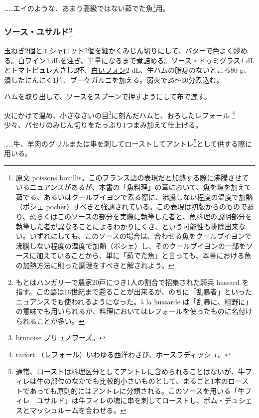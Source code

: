 \begin{recette}
\ldots{}\ldots{}エイのような、あまり高級ではない茹でた魚\footnote{原文
  poissons
  bouillis。このフランス語の表現だと加熱する際に沸騰させているニュアンスがあるが、本書の「魚料理」の章において、魚を塩を加えて茹でる、あるいはクールブイヨンで煮る際に、沸騰しない程度の温度で加熱（ポシェ
  pocher）すべきと強調されている。この表現は初版からのものであり、恐らくはこのソースの部分を実際に執筆した者と、魚料理の説明部分を執筆した者が異なることによるわかりにくさ、という可能性も排除出来ない。いずれにしても、このソースの場合は、合わせる魚をクールブイヨンで沸騰しない程度の温度で加熱（ポシェ）し、そのクールブイヨンの一部をソースに加えていることから、単に「茹でた魚」と言っても、本書における魚の加熱方法に則った調理をすべきと解されよう。}用。

\hypertarget{sauce-hussarde}{%
\subsubsection[ソース・ユサルド]{\texorpdfstring{ソース・ユサルド\footnote{もとはハンガリーで農家20戸につき1人の割合で招集された騎兵
  hussard
  を指す。この語は16世紀まで遡ることが出来るが、のちに「乱暴者」といったニュアンスでも使われるようになった。à
  la hussarde
  は「乱暴に、粗野に」の意味でも用いられるが、料理においてはレフォールを使ったものに名付けられることが多い。}}{ソース・ユサルド}}\label{sauce-hussarde}}



玉ねぎ2個とエシャロット2個を細かくみじん切りにして、バターで色よく炒める。白ワイン4
dLを注ぎ、半量になるまで煮詰める。\protect\hyperlink{sauce-demi-glace}{ソース・ドゥミグラス}4
dLとトマトピュレ大さじ2杯、\protect\hyperlink{fonds-blanc}{白いフォン}2
dL、生ハムの脂身のないところ80
g、潰したにんにく1片、ブーケガルニを加える。弱火で25〜30分煮込む。

ハムを取り出して、ソースをスプーンで押すようにして布で漉す。

火にかけて温め、小さなさいの目\footnote{brunoise ブリュノワーズ。}に刻んだハムと、おろしたレフォール
\footnote{raifort （レフォール）いわゆる西洋わさび、ホースラディッシュ。}少々、パセリのみじん切りをたっぷり1つまみ加えて仕上げる。

\ldots{}\ldots{}牛、羊肉のグリルまたは串を刺してローストしてアントレ\footnote{通常、ローストは料理区分としてアントレに含められることはないが、牛フィレは牛の部位のなかでも比較的小さいものとして、まるごと1本のローストであっても原則的にはアントレに分類される。このソースを用いる「牛フィレ　ユサルド」は牛フィレの塊に串を刺してローストし、ポム・デュシェスとマッシュルームを合わせる。}として供する際に用いる。


\end{recette}
